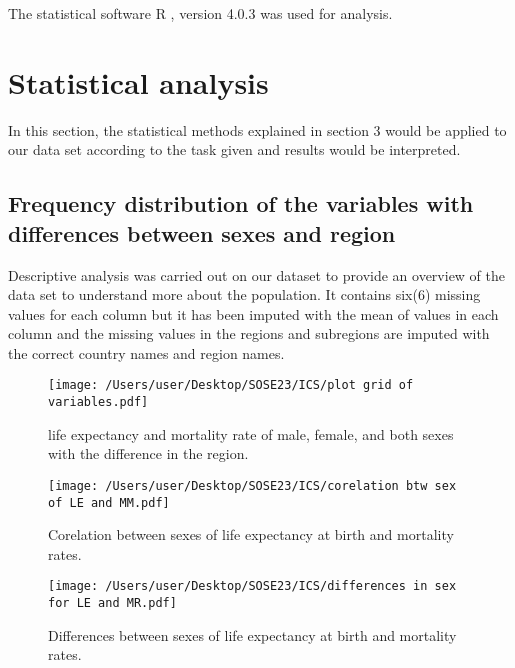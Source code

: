 \documentclass[12 pt]{scrartcl}
\begin{document}
The statistical software R \citep{R}, version 4.0.3 was used for analysis. 

\section{Statistical analysis}

In this section, the statistical methods explained in section 3 would be applied to our data set according to the task given and results would be interpreted.
 

\subsection{ Frequency distribution of the variables with differences between sexes and region } 
Descriptive analysis was carried out on our dataset to provide an overview of the data set to understand more about the population. It contains six(6) missing values for each column but it has been imputed with the mean of values in each column and the missing values in the regions and subregions are imputed with the correct country names and region names.



\begin{figure}[ht]
\centering
\texttt{[image: /Users/user/Desktop/SOSE23/ICS/plot grid of variables.pdf]}
\caption{life expectancy and mortality rate of male, female, and  both sexes with the difference in the region.}
\label{fig:histogram}
\end{figure}

\begin{figure}[ht]
\centering
\texttt{[image: /Users/user/Desktop/SOSE23/ICS/corelation btw sex of LE and MM.pdf]}
\caption{Corelation between sexes of life expectancy at birth and mortality rates.}
\label{fig:histogram}
\end{figure}


\begin{figure}[ht]
\centering
\texttt{[image: /Users/user/Desktop/SOSE23/ICS/differences in sex for LE and MR.pdf]}
\caption{Differences between sexes of life expectancy at birth and mortality rates.}
\label{fig:histogram}
\end{figure}
\end{document}
